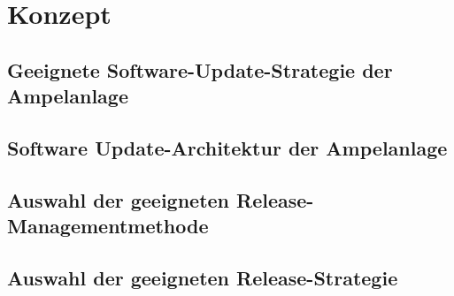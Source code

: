 \section{Konzept}

\subsection{Geeignete Software-Update-Strategie der Ampelanlage}

\subsection{Software Update-Architektur der Ampelanlage}

\subsection{Auswahl der geeigneten Release-Managementmethode}

\subsection{Auswahl der geeigneten Release-Strategie}










